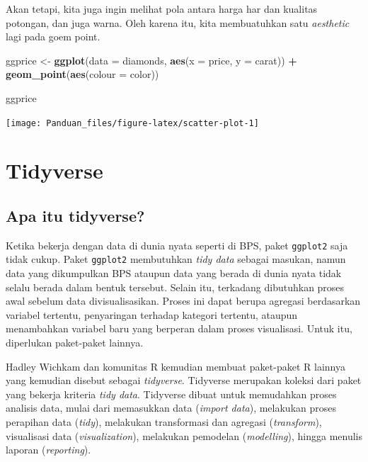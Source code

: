 \documentclass[]{book}
\newenvironment{Shaded}{\begin{snugshade}}{\end{snugshade}}
\newcommand{\KeywordTok}[1]{\textcolor[rgb]{0.13,0.29,0.53}{\textbf{#1}}}
\newcommand{\DataTypeTok}[1]{\textcolor[rgb]{0.13,0.29,0.53}{#1}}
\newcommand{\StringTok}[1]{\textcolor[rgb]{0.31,0.60,0.02}{#1}}
\newcommand{\OperatorTok}[1]{\textcolor[rgb]{0.81,0.36,0.00}{\textbf{#1}}}
\newcommand{\NormalTok}[1]{#1}
\begin{document}
Akan tetapi, kita juga ingin melihat pola antara harga har dan kualitas
potongan, dan juga warna. Oleh karena itu, kita membuatuhkan satu
\emph{aesthetic} lagi pada goem point.

\begin{Shaded}
\begin{Highlighting}[]
\NormalTok{ggprice <-}\StringTok{ }\KeywordTok{ggplot}\NormalTok{(}\DataTypeTok{data =}\NormalTok{ diamonds, }\KeywordTok{aes}\NormalTok{(}\DataTypeTok{x =}\NormalTok{ price, }\DataTypeTok{y =}\NormalTok{ carat)) }\OperatorTok{+}
\StringTok{        }\KeywordTok{geom_point}\NormalTok{(}\KeywordTok{aes}\NormalTok{(}\DataTypeTok{colour =}\NormalTok{ color))}

\NormalTok{ggprice}
\end{Highlighting}
\end{Shaded}

\begin{center}\texttt{[image: Panduan\_files/figure-latex/scatter-plot-1]} \end{center}

\chapter{Tidyverse}\label{tidyverse}

\section{Apa itu tidyverse?}\label{apa-itu-tidyverse}

Ketika bekerja dengan data di dunia nyata seperti di BPS, paket
\texttt{ggplot2} saja tidak cukup. Paket \texttt{ggplot2} membutuhkan
\emph{tidy data} sebagai masukan, namun data yang dikumpulkan BPS
ataupun data yang berada di dunia nyata tidak selalu berada dalam bentuk
tersebut. Selain itu, terkadang dibutuhkan proses awal sebelum data
divisualisasikan. Proses ini dapat berupa agregasi berdasarkan variabel
tertentu, penyaringan terhadap kategori tertentu, ataupun menambahkan
variabel baru yang berperan dalam proses visualisasi. Untuk itu,
diperlukan paket-paket lainnya.

Hadley Wichkam dan komunitas R kemudian membuat paket-paket R lainnya
yang kemudian disebut sebagai \emph{tidyverse}. Tidyverse merupakan
koleksi dari paket yang bekerja kriteria \emph{tidy data}. Tidyverse
dibuat untuk memudahkan proses analisis data, mulai dari memasukkan data
(\emph{import data}), melakukan proses perapihan data (\emph{tidy}),
melakukan transformasi dan agregasi (\emph{transform}), visualisasi data
(\emph{visualization}), melakukan pemodelan (\emph{modelling}), hingga
menulis laporan (\emph{reporting}).
\end{document}

